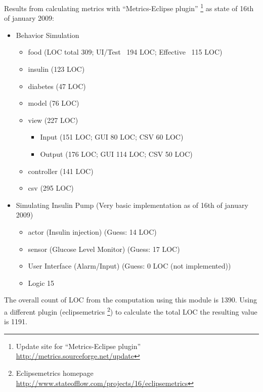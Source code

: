 Results from calculating metrics with ``Metrics-Eclipse plugin''
\footnote{Update site for ``Metrics-Eclipse plugin''
\url{http://metrics.sourceforge.net/update}} as state of 16th of january 2009:
\begin{itemize}
  \item Behavior Simulation
  	\begin{itemize}
        \item food (LOC total 309; UI/Test ~194 LOC; Effective ~115 LOC)
        \item insulin (123 LOC)
        \item diabetes (47 LOC)
        \item model (76 LOC)
        \item view (227 LOC)
        \begin{itemize}
          \item Input (151 LOC; GUI 80 LOC; CSV 60 LOC)
          \item Output (176 LOC; GUI 114 LOC; CSV 50 LOC)
        \end{itemize}
        \item controller (141 LOC)
        \item csv (295 LOC)
    \end{itemize}
  \item Simulating Insulin Pump (Very basic implementation as of 16th of
  january 2009)
  	\begin{itemize}
        \item actor (Insulin injection) (Guess: 14 LOC)
        \item sensor (Glucose Level Monitor) (Guess: 17 LOC)
        \item User Interface (Alarm/Input) (Guess: 0 LOC (not implemented))
        \item Logic 15
    \end{itemize}
\end{itemize} 
The overall count of LOC from the computation using this module is 1390.
Using a different plugin (eclipsemetrics \footnote{Eclipsemetrics homepage
\url{http://www.stateofflow.com/projects/16/eclipsemetrics}}) to calculate the
total LOC the resulting value is 1191.
